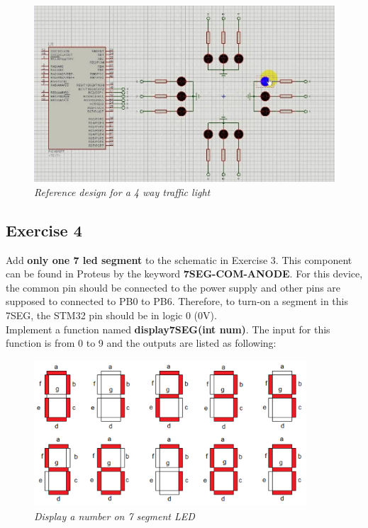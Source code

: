 \begin{figure}[!htp]
    \centering
    \includegraphics[width=5in]{source/picture/bai_1/pic2.jpg}
    \caption{\textit{Reference design for a 4 way traffic light}}
    \label{bai1_pic2}
\end{figure}

\subsection{Exercise 4}
Add \textbf{only one 7 led segment} to the schematic in Exercise 3. This component can be found in Proteus by the keyword \textbf{7SEG-COM-ANODE}. For this device, the common pin should be connected to the power supply and other pins are supposed to connected to PB0 to PB6. Therefore, to turn-on a segment in this 7SEG, the STM32 pin should be in logic 0 (0V).\\

Implement a function named \textbf{display7SEG(int num)}. The input for this function is from 0 to 9 and the outputs are listed as following:

\begin{figure}[!htp]
    \centering
    \includegraphics[width=4in]{source/picture/bai_1/pic3.PNG}
    \caption{\textit{Display a number on  7 segment LED}}
    \label{bai1_pic3}
\end{figure}

